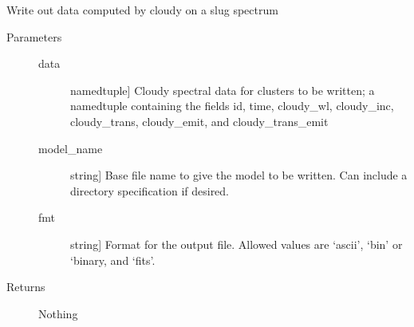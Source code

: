 \documentclass[letterpaper,10pt,english]{sphinxmanual}
\begin{document}
\begin{fulllineitems}
\label{\detokenize{cloudy:slugpy.cloudy.write_cluster_cloudyspec}}
Write out data computed by cloudy on a slug spectrum
\begin{description}
\item[{Parameters}] \leavevmode\begin{description}
\item[{data}] \leavevmode{[}namedtuple{]}
Cloudy spectral data for clusters to be written; a namedtuple
containing the fields id, time, cloudy\_wl, cloudy\_inc, cloudy\_trans,
cloudy\_emit, and cloudy\_trans\_emit

\item[{model\_name}] \leavevmode{[}string{]}
Base file name to give the model to be written. Can include a
directory specification if desired.

\item[{fmt}] \leavevmode{[}string{]}
Format for the output file. Allowed values are ‘ascii’, ‘bin’
or ‘binary, and ‘fits’.

\end{description}

\item[{Returns}] \leavevmode
Nothing

\end{description}

\end{fulllineitems}

\end{document}
